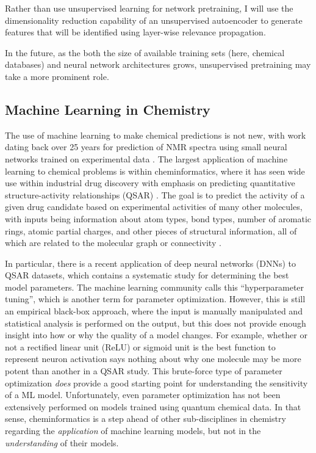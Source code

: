 \documentclass[12pt]{article}
\begin{document}
Rather than use unsupervised learning for network pretraining, I will use the dimensionality reduction capability of an unsupervised autoencoder to generate features that will be identified using layer-wise relevance propagation.

In the future, as the both the size of available training sets (here, chemical databases) and neural network architectures grows, unsupervised pretraining may take a more prominent role.


\subsection{Machine Learning in Chemistry}
\label{sec:org9e3a9da}

The use of machine learning to make chemical predictions is not new, with work dating back over 25 years for prediction of NMR spectra using small neural networks trained on experimental data \cite{THOMSEN1989212}. The largest application of machine learning to chemical problems is within cheminformatics, where it has seen wide use within industrial drug discovery with emphasis on predicting quantitative structure-activity relationships (QSAR) \cite{doi:10.1080/17460441.2016.1201262}. The goal is to predict the activity of a given drug candidate based on experimental activities of many other molecules, with inputs being information about atom types, bond types, number of aromatic rings, atomic partial charges, and other pieces of structural information, all of which are related to the molecular graph or connectivity \cite{Kearnes2016}.

In particular, there is a recent application of deep neural networks (DNNs) to QSAR datasets\cite{doi:10.1021/ci500747n}, which contains a systematic study for determining the best model parameters. The machine learning community calls this ``hyperparameter tuning'', which is another term for parameter optimization. However, this is still an empirical black-box approach, where the input is manually manipulated and statistical analysis is performed on the output, but this does not provide enough insight into how or why the quality of a model changes. For example, whether or not a rectified linear unit (ReLU) or sigmoid unit is the best function to represent neuron activation says nothing about why one molecule may be more potent than another in a QSAR study. This brute-force type of parameter optimization \emph{does} provide a good starting point for understanding the sensitivity of a ML model. Unfortunately, even parameter optimization has not been extensively performed on models trained using quantum chemical data. In that sense, cheminformatics is a step ahead of other sub-disciplines in chemistry regarding the \emph{application} of machine learning models, but not in the \emph{understanding} of their models. 
\end{document}
